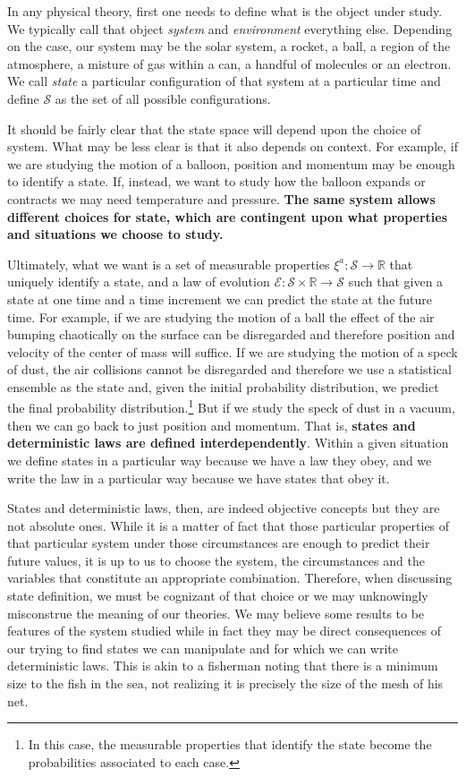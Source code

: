 \documentclass[applsci,article,submit,moreauthors,pdftex]{Definitions/mdpi}
\begin{document}
In any physical theory, first one needs to define what is the object under study. We typically call that object \emph{system} and \emph{environment} everything else. Depending on the case, our system may be the solar system, a rocket, a ball, a region of the atmosphere, a misture of gas within a can, a handful of molecules or an electron. We call \emph{state} a particular configuration of that system at a particular time and define $\mathcal{S}$ as the set of all possible configurations.

It should be fairly clear that the state space will depend upon the choice of system. What may be less clear is that it also depends on context. For example, if we are studying the motion of a balloon, position and momentum may be enough to identify a state. If, instead, we want to study how the balloon expands or contracts we may need temperature and pressure. \textbf{The same system allows different choices for state, which are contingent upon what properties and situations we choose to study.} 

Ultimately, what we want is a set of measurable properties $\xi^a : \mathcal{S} \to \mathbb{R}$ that uniquely identify a state, and a law of evolution $\mathcal{E} : \mathcal{S} \times \mathbb{R} \to \mathcal{S}$ such that given a state at one time and a time increment we can predict the state at the future time. For example, if we are studying the motion of a ball the effect of the air bumping chaotically on the surface can be disregarded and therefore position and velocity of the center of mass will suffice. If we are studying the motion of a speck of dust, the air collisions cannot be disregarded and therefore we use a statistical ensemble as the state and, given the initial probability distribution, we predict the final probability distribution.\footnote{In this case, the measurable properties that identify the state become the probabilities associated to each case.} But if we study the speck of dust in a vacuum, then we can go back to just position and momentum. That is, \textbf{states and deterministic laws are defined interdependently}. Within a given situation we define states in a particular way because we have a law they obey, and we write the law in a particular way because we have states that obey it.

States and deterministic laws, then, are indeed objective concepts but they are not absolute ones. While it is a matter of fact that those particular properties of that particular system under those circumstances are enough to predict their future values, it is up to us to choose the system, the circumstances and the variables that constitute an appropriate combination. Therefore, when discussing state definition, we must be cognizant of that choice or we may unknowingly misconstrue the meaning of our theories. We may believe some results to be features of the system studied while in fact they may be direct consequences of our trying to find states we can manipulate and for which we can write deterministic laws. This is akin to a fisherman noting that there is a minimum size to the fish in the sea, not realizing it is precisely the size of the mesh of his net.
\end{document}
